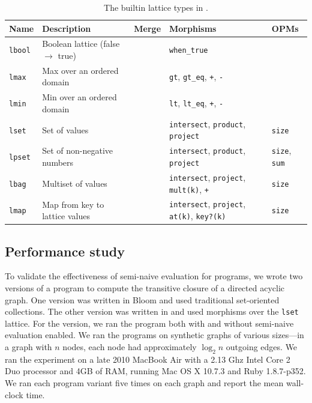 \begin{table}[t]
\begin{tabular}{|l|l|l|l|l|}
\hline
\textbf{Name} & \textbf{Description} & \textbf{Merge} & \textbf{Morphisms} & \textbf{OPMs}\\
\hline
\texttt{lbool} & Boolean lattice (false $\to$ true) & & \texttt{when\_true} & \\
\texttt{lmax} & Max over an ordered domain & &\texttt{gt},
\texttt{gt\_eq}, \texttt{+}, \texttt{-} & \\
\texttt{lmin} & Min over an ordered domain & &\texttt{lt}, \texttt{lt\_eq},
\texttt{+}, \texttt{-} & \\
\texttt{lset} & Set of values & & \texttt{intersect}, \texttt{product},
\texttt{project} & \texttt{size} \\
\texttt{lpset} & Set of non-negative numbers & &
\texttt{intersect}, \texttt{product}, \texttt{project}& \texttt{size}, \texttt{sum} \\
\texttt{lbag} & Multiset of values & & \texttt{intersect},
\texttt{project}, \texttt{mult(k)}, \texttt{+} & \texttt{size}\\
\texttt{lmap} & Map from key to lattice values & &
\texttt{intersect}, \texttt{project}, \texttt{at(k)}, \texttt{key?(k)} & \texttt{size}\\
\hline
\end{tabular}
\caption{The builtin lattice types in \lang.}
\label{tbl:builtin-lattices}
\end{table}

\subsection{Performance study}
To validate the effectiveness of semi-naive evaluation for \lang programs, we
wrote two versions of a program to compute the transitive closure of a directed
acyclic graph. One version was written in Bloom and used traditional
set-oriented collections. The other version was written in \lang and used
morphisms over the \texttt{lset} lattice. For the \lang version, we ran the
program both with and without semi-naive evaluation enabled. We ran the programs
on synthetic graphs of various sizes---in a graph with $n$ nodes, each node had
approximately $\log_2 n$ outgoing edges. We ran the experiment on a late 2010
MacBook Air with a 2.13 Ghz Intel Core 2 Duo processor and 4GB of RAM, running
Mac OS X 10.7.3 and Ruby 1.8.7-p352. We ran each program variant five times on
each graph and report the mean wall-clock time.


